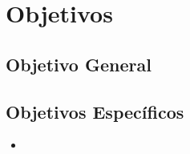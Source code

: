 
\chapter*{Objetivos} 

\section*{Objetivo General}


\section*{Objetivos Específicos}
\begin{itemize}
    \item 
	

	
	
\end{itemize}
